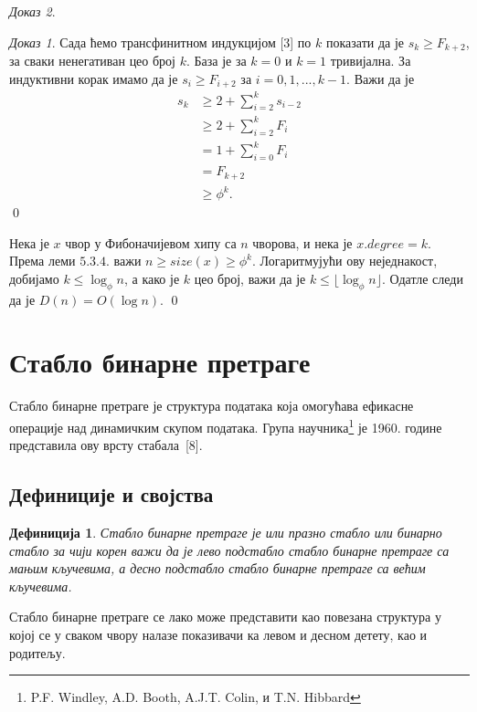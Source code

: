 \documentclass[11pt, a4paper]{article}
\newtheorem{definicija}{\selectlanguage{russian} Дефиниција} [subsection]
\theoremstyle{remark}
\newtheorem*{dokaz}{\selectlanguage{russian} Доказ}
\numberwithin{equation}{section}
\begin{document}
\begin{dokaz}
\begin{dokaz}
		\indent Сада ћемо трансфинитном индукцијом [3] по $k$ показати да је $s_k \geq F_{k+2}$, за сваки ненегативан цео број $k$. База је за $k=0$ и $k=1$ тривијална. За индуктивни корак имамо да је $s_i \geq F_{i+2}$ за $i=0, 1, ..., k-1$. Важи да је
			\begin{equation}
			\begin{split}
			s_k & \geq 2+ \sum_{i=2}^{k} s_{i-2} \\
			& \geq 2+\sum_{i=2}^{k}F_i \\
			&= 1+\sum_{i=0}^{k}F_i \\
			&=F_{k+2} \\
			& \geq \phi^{k}.
			\end{split}
		\end{equation}
		\qed \\
	\end{dokaz}

	Нека је $x$ чвор у Фибоначијевом хипу са $n$ чворова, и нека је $x.degree=k$. Према леми $5.3.4.$ важи $n \geq size(x) \geq \phi^{k}$. Логаритмујући ову неједнакост, добијамо $k \leq \log_\phi n$, а како је $k$ цео број, важи да је $k \leq \lfloor \log_\phi n \rfloor$. Одатле следи да је $D(n)=O(\log n)$. \qed
	\end{dokaz}
	
	\newpage
	
	\section{Стабло бинарне претраге}
	
	Стабло бинарне претраге је структура података која омогућава ефикасне операције над динамичким скупом података. Група научника\footnote{P.F. Windley, A.D. Booth, A.J.T. Colin, и T.N. Hibbard} је 1960. године представила ову врсту \mbox{стабала [8]}.
	
	\subsection{Дефиниције и својства}
	
	\begin{definicija}
		\normalfont
		Стабло бинарне претраге је или празно стабло или бинарно стабло за чији корен важи да је лево подстабло стабло бинарне претраге са мањим кључевима, а десно подстабло стабло бинарне претраге са већим кључевима.
	\end{definicija}

	Стабло бинарне претраге се лако може представити као повезана структура у којој се у сваком чвору налазе показивачи ка левом и десном детету, као и родитељу.
	
\end{document}
